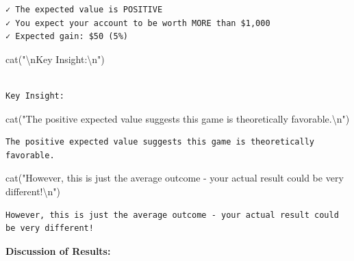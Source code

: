\documentclass[
  letterpaper,
  DIV=11,
  numbers=noendperiod]{scrartcl}
\newenvironment{Shaded}{\begin{snugshade}}{\end{snugshade}}
\newcommand{\FunctionTok}[1]{\textcolor[rgb]{0.28,0.35,0.67}{#1}}
\newcommand{\NormalTok}[1]{\textcolor[rgb]{0.00,0.23,0.31}{#1}}
\newcommand{\SpecialCharTok}[1]{\textcolor[rgb]{0.37,0.37,0.37}{#1}}
\newcommand{\StringTok}[1]{\textcolor[rgb]{0.13,0.47,0.30}{#1}}
\begin{document}
\begin{verbatim}
✓ The expected value is POSITIVE
✓ You expect your account to be worth MORE than $1,000
✓ Expected gain: $50 (5%)
\end{verbatim}

\begin{Shaded}
\begin{Highlighting}[]
\FunctionTok{cat}\NormalTok{(}\StringTok{"}\SpecialCharTok{\textbackslash{}n}\StringTok{Key Insight:}\SpecialCharTok{\textbackslash{}n}\StringTok{"}\NormalTok{)}
\end{Highlighting}
\end{Shaded}

\begin{verbatim}

Key Insight:
\end{verbatim}

\begin{Shaded}
\begin{Highlighting}[]
\FunctionTok{cat}\NormalTok{(}\StringTok{"The positive expected value suggests this game is theoretically favorable.}\SpecialCharTok{\textbackslash{}n}\StringTok{"}\NormalTok{)}
\end{Highlighting}
\end{Shaded}

\begin{verbatim}
The positive expected value suggests this game is theoretically favorable.
\end{verbatim}

\begin{Shaded}
\begin{Highlighting}[]
\FunctionTok{cat}\NormalTok{(}\StringTok{"However, this is just the average outcome {-} your actual result could be very different!}\SpecialCharTok{\textbackslash{}n}\StringTok{"}\NormalTok{)}
\end{Highlighting}
\end{Shaded}

\begin{verbatim}
However, this is just the average outcome - your actual result could be very different!
\end{verbatim}

\textbf{Discussion of Results:}
\end{document}
